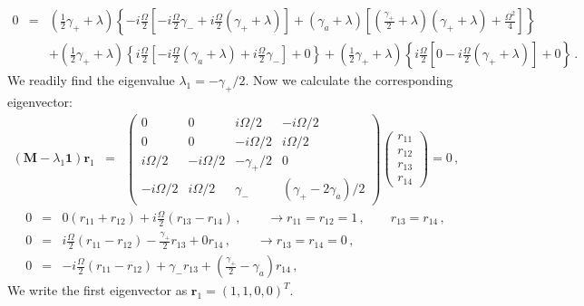 \documentclass[twocolumn,aps,eqsecnum,showkeys,amsmath]{revtex4-2}
\begin{document}
\begin{widetext}
%
\begin{eqnarray*} 	
0 &=& (\frac{1}{2} \gamma_+ +\lambda) \left\{ - i \frac{\Omega}{2} 
	\left[  - i \frac{\Omega}{2} \gamma_-   
	+i \frac{\Omega}{2} (\gamma_+ +\lambda)  \right] 
	+(\gamma_a +\lambda) \left[ (\frac{\gamma_+}{2} +\lambda) 
	(\gamma_+ +\lambda) +\frac{\Omega^2}{4} \right] \right\}  		\\ 
%
&& +(\frac{1}{2} \gamma_+ +\lambda) \left\{ i \frac{\Omega}{2} 
	\left[  - i \frac{\Omega}{2} (\gamma_a +\lambda)    
	+i \frac{\Omega}{2} \gamma_-  \right] +0 \right\} 
+(\frac{1}{2} \gamma_+ +\lambda) \left\{ i \frac{\Omega}{2} 
	\left[ 0 - i \frac{\Omega}{2} (\gamma_+ +\lambda) \right] +0 \right\} \,.
\end{eqnarray*}
We readily find the eigenvalue $\lambda_1 =-\gamma_+/2$. 
Now we calculate the corresponding eigenvector: 
%
\begin{eqnarray*} 	
( \mathbf{M} -\lambda_1 \mathbf{1} ) \mathbf{r}_1 
&=& \left( \begin{array}{cccc}
	0 & 0 & i\Omega/2 & -i\Omega/2 \\ 
	0 & 0 & -i\Omega/2 & i\Omega/2 	 \\ 
	i\Omega/2 & -i\Omega/2 & -\gamma_+/2 & 0 		\\ 
	-i\Omega/2 & i\Omega/2 & \gamma_- & (\gamma_+ -2\gamma_a)/2 
	\end{array}  \right) 
\left( \begin{array}{c}  r_{11} \\ r_{12} \\ r_{13} \\ r_{14} 	\end{array}  \right)  
	= 0 \,,  	
\end{eqnarray*}
%
\begin{eqnarray*} 	
0 &=& 0(r_{11} +r_{12}) +i \frac{\Omega}{2} ( r_{13} -r_{14} ) \,, 
	\qquad \to r_{11} = r_{12} =1 \,, \qquad r_{13} = r_{14} \,,	\\ 
0 &=& i\frac{\Omega}{2} ( r_{11} -r_{12} ) -\frac{\gamma_+}{2} r_{13} +0 r_{14} \,, 
	\qquad \to r_{13} =r_{14} =0 \,, 	\\
0 &=& -i\frac{\Omega}{2} ( r_{11} -r_{12} ) +\gamma_- r_{13} 
	+ (\frac{\gamma_+}{2} -\gamma_a) r_{14} \,,
\end{eqnarray*}
We write the first eigenvector as $\mathbf{r}_1 =(1,1,0,0)^T$.  


\end{widetext}
\end{document}
